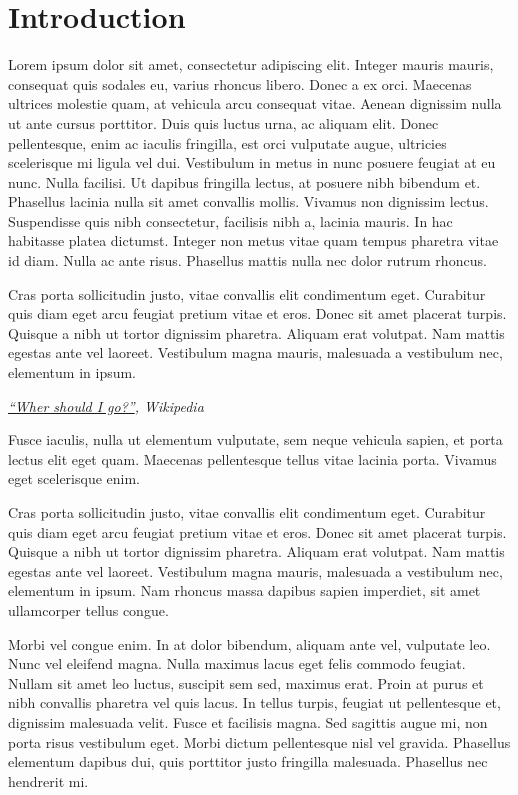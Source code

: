 \chapter{Introduction}

Lorem ipsum dolor sit amet, consectetur adipiscing elit. Integer mauris mauris, consequat quis sodales eu, varius rhoncus libero. Donec a ex orci. Maecenas ultrices molestie quam, at vehicula arcu consequat vitae. Aenean dignissim nulla ut ante cursus porttitor. Duis quis luctus urna, ac aliquam elit. Donec pellentesque, enim ac iaculis fringilla, est orci vulputate augue, ultricies scelerisque mi ligula vel dui. Vestibulum in metus in nunc posuere feugiat at eu nunc. Nulla facilisi. Ut dapibus fringilla lectus, at posuere nibh bibendum et. Phasellus lacinia nulla sit amet convallis mollis. Vivamus non dignissim lectus. Suspendisse quis nibh consectetur, facilisis nibh a, lacinia mauris. In hac habitasse platea dictumst. Integer non metus vitae quam tempus pharetra vitae id diam. Nulla ac ante risus. Phasellus mattis nulla nec dolor rutrum rhoncus.

\epigraph{Cras porta sollicitudin justo, vitae convallis elit condimentum eget. Curabitur quis diam eget arcu feugiat pretium vitae et eros. Donec sit amet placerat turpis. Quisque a nibh ut tortor dignissim pharetra. Aliquam erat volutpat. Nam mattis egestas ante vel laoreet. Vestibulum magna mauris, malesuada a vestibulum nec, elementum in ipsum.}{\textit{\href{https://wikipedia.org/}{``Wher should I go?''}, Wikipedia}}

Fusce iaculis, nulla ut elementum vulputate, sem neque vehicula sapien, et porta lectus elit eget quam. Maecenas pellentesque tellus vitae lacinia porta. Vivamus eget scelerisque enim. 

Cras porta sollicitudin justo, vitae convallis elit condimentum eget. Curabitur quis diam eget arcu feugiat pretium vitae et eros. Donec sit amet placerat turpis. Quisque a nibh ut tortor dignissim pharetra. Aliquam erat volutpat. Nam mattis egestas ante vel laoreet. Vestibulum magna mauris, malesuada a vestibulum nec, elementum in ipsum. Nam rhoncus massa dapibus sapien imperdiet, sit amet ullamcorper tellus congue.

Morbi vel congue enim. In at dolor bibendum, aliquam ante vel, vulputate leo. Nunc vel eleifend magna. Nulla maximus lacus eget felis commodo feugiat. Nullam sit amet leo luctus, suscipit sem sed, maximus erat. Proin at purus et nibh convallis pharetra vel quis lacus. In tellus turpis, feugiat ut pellentesque et, dignissim malesuada velit. Fusce et facilisis magna. Sed sagittis augue mi, non porta risus vestibulum eget. Morbi dictum pellentesque nisl vel gravida. Phasellus elementum dapibus dui, quis porttitor justo fringilla malesuada. Phasellus nec hendrerit mi.


